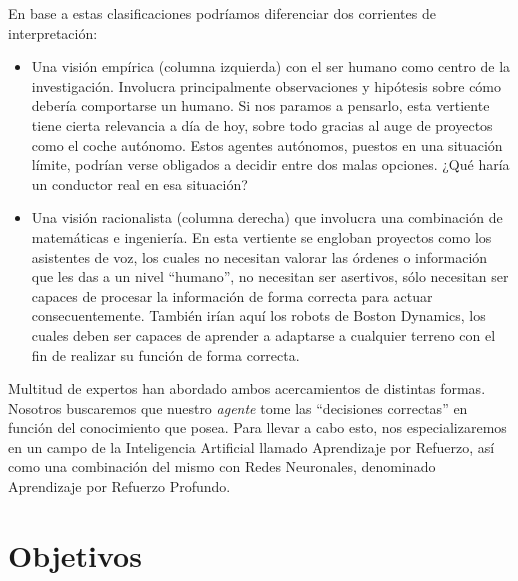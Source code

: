 En base a estas clasificaciones podríamos diferenciar dos corrientes de interpretación:
\begin{itemize}
    \item Una visión empírica (columna izquierda) con el ser humano como centro de la investigación. Involucra principalmente observaciones y hipótesis sobre cómo debería comportarse un humano. Si nos paramos a pensarlo, esta vertiente tiene cierta relevancia a día de hoy, sobre todo gracias al auge de proyectos como el coche autónomo. Estos agentes autónomos, puestos en una situación límite, podrían verse obligados a decidir entre dos malas opciones. ¿Qué haría un conductor real en esa situación?
    \item Una visión racionalista (columna derecha) que involucra una combinación de matemáticas e ingeniería. En esta vertiente se engloban proyectos como los asistentes de voz, los cuales no necesitan valorar las órdenes o información que les das a un nivel ``humano'', no necesitan ser asertivos, sólo necesitan ser capaces de procesar la información de forma correcta para actuar consecuentemente. También irían aquí los robots de Boston Dynamics, los cuales deben ser capaces de aprender a adaptarse a cualquier terreno con el fin de realizar su función de forma correcta.
\end{itemize}

Multitud de expertos han abordado ambos acercamientos de distintas formas. Nosotros buscaremos que nuestro \textit{agente} tome las ``decisiones correctas'' en función del conocimiento que posea. Para llevar a cabo esto, nos especializaremos en un campo de la Inteligencia Artificial llamado Aprendizaje por Refuerzo, así como una combinación del mismo con Redes Neuronales, denominado Aprendizaje por Refuerzo Profundo.


\section{Objetivos}

